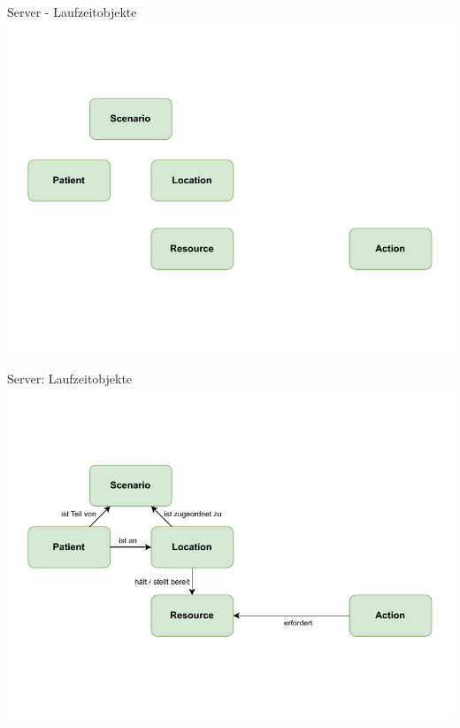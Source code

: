 \begin{frame}{Server - Laufzeitobjekte}
	\centering
	\includegraphics[height=.9\textheight]{images/server/laufzeit_objekte_1.pdf}
\end{frame}

\begin{frame}[noframenumbering]{Server: Laufzeitobjekte}
	\centering
	\includegraphics[height=.9\textheight]{images/server/laufzeit_objekte_2.pdf}
\end{frame}

